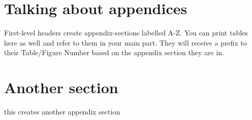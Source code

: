 \documentclass[
  man,floatsintext]{apa7}
\newlength{\cslhangindent}
\newlength{\cslentryspacingunit} %
\newenvironment{CSLReferences}[2] %
 {%
  \setlength{\parindent}{0pt}
  \ifodd #1
  \let\oldpar\par
  \def\par{\hangindent=\cslhangindent\oldpar}
  \fi
  \setlength{\parskip}{#2\cslentryspacingunit}
 }%
 {}
\begin{document}
\hypertarget{refs}{}
\begin{CSLReferences}{0}{0}
\end{CSLReferences}

\newpage

\hypertarget{appendix-appendix}{%
\appendix}


\hypertarget{talking-about-appendices}{%
\section{Talking about appendices}\label{talking-about-appendices}}

First-level headers create appendix-sections labelled A-Z. You can print tables here as well and refer to them in your main part. They will receive a prefix to their Table/Figure Number based on the appendix section they are in.

\hypertarget{another-section}{%
\section{Another section}\label{another-section}}

this creates another appendix section
\end{document}
